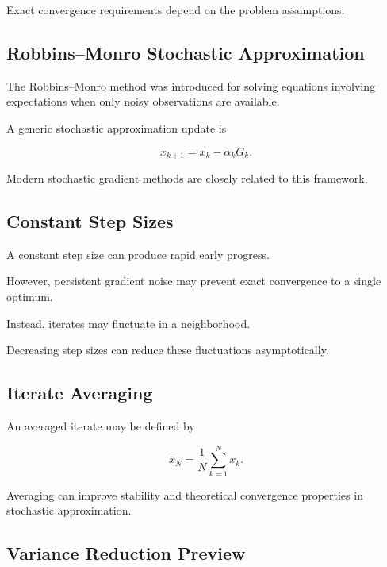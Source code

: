 Exact convergence requirements depend on the problem assumptions.

\subsection{Robbins--Monro Stochastic Approximation}
\label{subsec:robbins-monro}

The Robbins--Monro method was introduced for solving equations involving
expectations when only noisy observations are available.

A generic stochastic approximation update is

\[
\boxed{
x_{k+1}
=
x_k
-
\alpha_k
G_k.
}
\]

Modern stochastic gradient methods are closely related to this framework.

\subsection{Constant Step Sizes}
\label{subsec:constant-step-size-sgd}

A constant step size can produce rapid early progress.

However, persistent gradient noise may prevent exact convergence to a
single optimum.

Instead, iterates may fluctuate in a neighborhood.

Decreasing step sizes can reduce these fluctuations asymptotically.

\subsection{Iterate Averaging}
\label{subsec:iterate-averaging}

An averaged iterate may be defined by

\[
\boxed{
\bar{x}_N
=
\frac1N
\sum_{k=1}^{N}
x_k.
}
\]

Averaging can improve stability and theoretical convergence properties in
stochastic approximation.

\subsection{Variance Reduction Preview}
\label{subsec:stochastic-variance-reduction}

